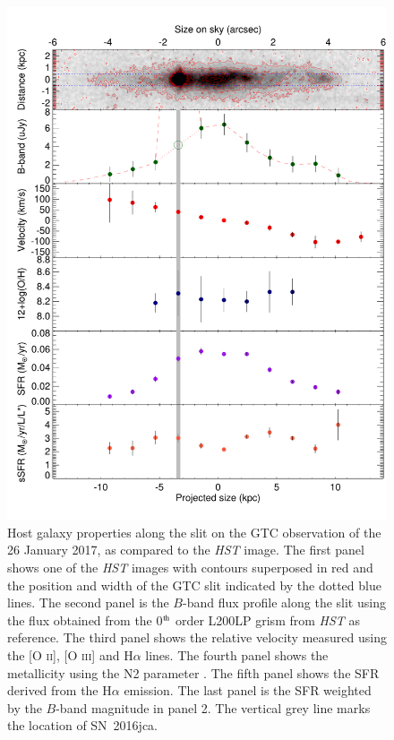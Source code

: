 \documentclass[traditabstract,longauth]{aa}
\begin{document}
\begin{figure}
   \includegraphics[width=\columnwidth]{Fig16_161219B_host-eps-converted-to.pdf}
      \caption{Host galaxy properties along the slit on the GTC observation of the 26 January 2017, as compared to the \emph{HST} image. The first panel shows one of the \emph{HST} images with contours superposed in red and the position and width of the GTC slit indicated by the dotted blue lines. The second panel is the $B$-band flux profile  along the slit using the flux obtained from the 0$^{\rm th}$ order L200LP grism from \emph{HST} as reference. The third panel shows the relative velocity measured using the [O \textsc{ii}], [O \textsc{iii}] and H$\alpha$ lines. The fourth panel shows the metallicity using the N2 parameter \citep{Marino13}. The fifth panel shows the SFR derived from the H$\alpha$ emission. The last panel is the SFR weighted by the $B$-band magnitude in panel 2. The vertical grey line marks the location of SN~2016jca. }
         \label{FigHostProp}
   \end{figure}
\end{document}
